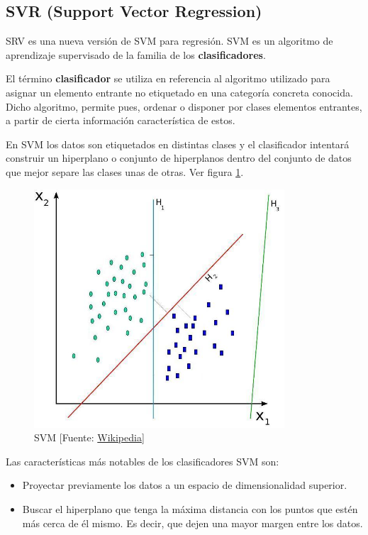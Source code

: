 	\subsection{SVR (Support Vector Regression)}
	\label{makereference4.3.2}

	SRV es una nueva versión de SVM para regresión. SVM es un algoritmo de aprendizaje supervisado de la familia de los \textbf{clasificadores}.

	El término \textbf{clasificador} se utiliza en referencia al algoritmo utilizado para asignar un elemento entrante no etiquetado en una categoría concreta conocida. Dicho algoritmo, permite pues, ordenar o disponer por clases elementos entrantes, a partir de cierta información característica de estos.

	En SVM los datos son etiquetados en distintas clases y el clasificador intentará construir un hiperplano o conjunto de hiperplanos dentro del conjunto de datos que mejor separe las clases unas de otras. Ver figura \ref{svm}.

	\begin{figure}[htb]
		
		\begin{center}
			\includegraphics[height=3.5in]{figures/svm.jpg}
			\caption{SVM [Fuente: \href{www.wikipedia.org}{Wikipedia}]}
		\end{center}
		\label{svm}
	\end{figure}

	Las características más notables de los clasificadores SVM son:
	\begin{itemize}
		\item Proyectar previamente los datos a un espacio de dimensionalidad superior.
		\item Buscar el hiperplano que tenga la máxima distancia con los puntos que estén más cerca de él mismo. Es decir, que dejen una mayor margen entre los datos.
	\end{itemize}


